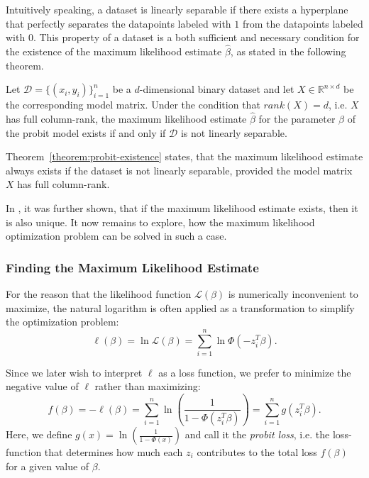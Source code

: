 \noindent Intuitively speaking, a dataset is linearly separable if there
exists a hyperplane that perfectly separates the datapoints labeled
with $1$ from the datapoints labeled with $0$.
This property of a dataset is a both sufficient and
necessary condition for the existence of the
maximum likelihood estimate $\hat{\beta}$, as stated in the following
theorem.

\begin{theorem}
    \label{theorem:probit-existence}
    Let $\mathcal{D}=\{(x_i, y_i)\}_{i=1}^n$ be a $d$-dimensional
    binary dataset and let
    $X \in \mathbb{R}^{n \times d}$ be the corresponding model matrix.
    Under the condition that $rank(X)=d$, i.e. $X$ has full column-rank,
    the maximum likelihood estimate $\hat{\beta}$ for the
    parameter $\beta$ of the probit model
    exists if and only if $\mathcal{D}$ is not linearly separable.
\end{theorem}

\noindent Theorem~\ref{theorem:probit-existence} states,
that the maximum likelihood estimate always exists if the dataset
is not linearly separable, provided the model matrix $X$ has
full column-rank.

\noindent In \cite{wedderburn}, it was further shown, that if the maximum likelihood
estimate exists, then it is also unique.
It now remains to explore, how the maximum likelihood optimization
problem can be solved in such a case.

\subsubsection{Finding the Maximum Likelihood Estimate}

For the reason that the likelihood function $\mathcal{L}(\beta)$ is
numerically inconvenient to maximize, the natural logarithm is often
applied as a transformation to simplify the optimization problem:
\begin{equation}
    \ell(\beta) = \ln \mathcal{L}(\beta) = \sum_{i=1}^n \ln \Phi(- z_i^T \beta).
\end{equation}

\noindent Since we later wish to interpret $\ell$ as a loss function, we prefer
to minimize the negative value of $\ell$ rather than maximizing:
\begin{equation}
    f(\beta) = -\ell(\beta)
    = \sum_{i=1}^n \ln \left( \frac{1}{1 - \Phi(z_i^T \beta)} \right)
    = \sum_{i=1}^n g(z_i^T \beta).
\end{equation}
Here, we define $g(x) = \ln \left(\frac{1}{1 - \Phi(x)}\right)$
and call it the \textit{probit loss}, i.e. the loss-function that
determines how much each $z_i$ contributes to the total loss $f(\beta)$
for a given value of $\beta$.

